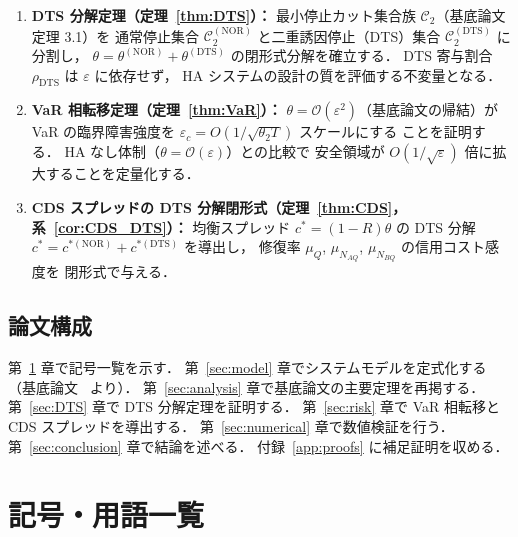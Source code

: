 \documentclass[12pt,a4paper]{article}
\theoremstyle{plain}
\theoremstyle{definition}
\theoremstyle{remark}
\newcommand{\calO}{\mathcal{O}}        %
\newcommand{\eps}{\varepsilon}         %
\newcommand{\calCtwo}{\mathcal{C}_2}   %
\newcommand{\calCNOR}{\calCtwo^{(\mathrm{NOR})}}
\newcommand{\calCDTS}{\calCtwo^{(\mathrm{DTS})}}
\newcommand{\thetaNOR}{\theta^{(\mathrm{NOR})}}
\newcommand{\thetaDTS}{\theta^{(\mathrm{DTS})}}
\newcommand{\rhoDTS}{\rho_{\mathrm{DTS}}}
\begin{document}
\begin{enumerate}
  \item \textbf{DTS 分解定理（定理~\ref{thm:DTS}）：}
    最小停止カット集合族 $\calCtwo$（基底論文 定理 3.1）を
    通常停止集合 $\calCNOR$ と二重誘因停止（DTS）集合 $\calCDTS$ に分割し，
    $\theta = \thetaNOR + \thetaDTS$ の閉形式分解を確立する．
    DTS 寄与割合 $\rhoDTS$ は $\eps$ に依存せず，
    HA システムの設計の質を評価する不変量となる．

  \item \textbf{VaR 相転移定理（定理~\ref{thm:VaR}）：}
    $\theta = \calO(\eps^2)$（基底論文の帰結）が
    VaR の臨界障害強度を $\eps_c = O(1/\sqrt{\theta_2 T})$ スケールにする
    ことを証明する．
    HA なし体制（$\theta = \calO(\eps)$）との比較で
    安全領域が $O(1/\sqrt{\eps})$ 倍に拡大することを定量化する．

  \item \textbf{CDS スプレッドの DTS 分解閉形式（定理~\ref{thm:CDS}，系~\ref{cor:CDS_DTS}）：}
    均衡スプレッド $c^* = (1-R)\theta$ の DTS 分解
    $c^* = c^{*(\mathrm{NOR})} + c^{*(\mathrm{DTS})}$ を導出し，
    修復率 $\mu_Q$, $\mu_{N_{AQ}}$, $\mu_{N_{BQ}}$ の信用コスト感度を
    閉形式で与える．
\end{enumerate}

\subsection{論文構成}

第~\ref{sec:notation} 章で記号一覧を示す．
第~\ref{sec:model} 章でシステムモデルを定式化する（基底論文~\cite{habase:v7} より）．
第~\ref{sec:analysis} 章で基底論文の主要定理を再掲する．
第~\ref{sec:DTS} 章で DTS 分解定理を証明する．
第~\ref{sec:risk} 章で VaR 相転移と CDS スプレッドを導出する．
第~\ref{sec:numerical} 章で数値検証を行う．
第~\ref{sec:conclusion} 章で結論を述べる．
付録~\ref{app:proofs} に補足証明を収める．

\section{記号・用語一覧}\label{sec:notation}
\end{document}

